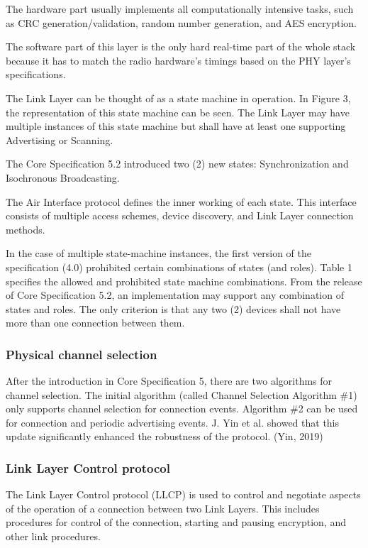 The hardware part usually implements all computationally intensive tasks,
such as CRC generation/validation, random number generation, and AES encryption. 

The software part of this layer is the only hard real-time part of
the whole stack because it has to match the radio hardware's timings
based on the PHY layer's specifications.

The Link Layer can be thought of as a state machine in operation.
In Figure 3, the representation of this state machine can be seen.
The Link Layer may have multiple instances of this state machine but shall have at least one supporting Advertising or Scanning.\cite{bt40}

The Core Specification 5.2 introduced two (2) new states:
Synchronization and Isochronous Broadcasting.

The Air Interface protocol defines the inner working of each state.
This interface consists of multiple access schemes, device discovery,
and Link Layer connection methods.

In the case of multiple state-machine instances, the first version of the
specification (4.0) prohibited certain combinations of states (and roles).
Table 1 specifies the allowed and prohibited state machine combinations.
From the release of Core Specification 5.2, an implementation may support
any combination of states and roles. The only criterion is that any two (2)
devices shall not have more than one connection between them. \cite{bt52}


\subsubsection{Physical channel selection}
\label{ble:link:sel}
After the introduction in Core Specification 5, there are two algorithms for
channel selection.
The initial algorithm (called Channel Selection Algorithm \#1) only supports
channel selection for connection events.
Algorithm \#2 can be used for connection and periodic advertising events.
J. Yin et al. showed that this update significantly enhanced the robustness
of the protocol. (Yin, 2019)

\subsubsection{Link Layer Control protocol}
\label{ble:link:llcp}
The Link Layer Control protocol (LLCP) is used to control and
negotiate aspects of the operation of a connection between two Link Layers.
This includes procedures for control of the connection, starting and pausing
encryption, and other link procedures. \cite{bt40}

